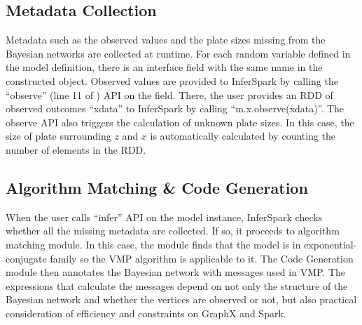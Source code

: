 \subsection{Metadata Collection}

Metadata such as the observed values and the plate sizes missing from the
Bayesian networks are collected at runtime. For each random variable defined in the model definition, 
there is an interface field with the
same name in the constructed object. Observed values are provided to InferSpark
by calling the ``{\sf observe}'' (line 11 of ) 
API on the field. 
There, the user provides an RDD of observed outcomes ``{\sf xdata}'' to InferSpark by calling
``{\sf m.x.observe(xdata)}''. The  {\sf observe} API also triggers 
the calculation of unknown plate sizes. 
In this case, the size of plate surrounding $z$ and $x$ is
automatically calculated by counting the number of elements in the RDD.


\subsection{Algorithm Matching \& Code Generation}


When the user calls ``{\sf infer}'' API on the model instance, InferSpark
checks whether all the missing metadata are collected. If so, it proceeds to
algorithm matching module. In this case, the module finds that the model is in
exponential-conjugate family so the VMP algorithm is applicable to it. The
Code Generation module then annotates the Bayesian network with messages used
in VMP. The expressions that calculate the messages depend on not only the
structure of the Bayesian network and whether the vertices are observed or
not, but also practical consideration of efficiency and constraints on GraphX
and Spark.

